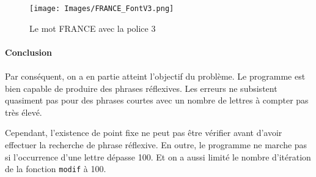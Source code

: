 \documentclass[a4paper, 12pt]{article}
\begin{document}
\begin{figure}[h]
\centering
\texttt{[image: Images/FRANCE\_FontV3.png]}
\caption{Le mot FRANCE avec la police 3}
\label{fig6}
\end{figure}
 
\newpage
{} %
	\vspace*{3cm} %
	\paragraph{\Huge{Conclusion}}

	\paragraph{}
	Par conséquent, on a en partie atteint l'objectif du problème. Le programme est bien capable de produire des phrases réflexives. Les erreurs ne subsistent quasiment pas pour des phrases courtes avec un nombre de lettres à compter pas très élevé.
	
	Cependant, l'existence de point fixe ne peut pas être vérifier avant d'avoir effectuer la recherche de phrase réflexive. En outre, le programme ne marche pas si l'occurrence d'une lettre dépasse 100. Et on a aussi limité le nombre d'itération de la fonction \texttt{modif} à 100.
	
\end{document}
